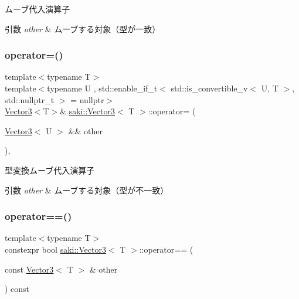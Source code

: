 ムーブ代入演算子 


\begin{DoxyParams}{引数}
{\em other} & ムーブする対象（型が一致） \\
\hline
\end{DoxyParams}
\mbox{\label{classsaki_1_1_vector3_ade6589bc06d9191aaccfe67cbd961a8b}} 
\subsubsection{\texorpdfstring{operator=()}{operator=()}\hspace{0.1cm}{\footnotesize\ttfamily [4/4]}}
{\footnotesize\ttfamily template$<$typename T$>$ \\
template$<$typename U , std\+::enable\+\_\+if\+\_\+t$<$ std\+::is\+\_\+convertible\+\_\+v$<$ U, T $>$, std\+::nullptr\+\_\+t $>$  = nullptr$>$ \\
\mbox{\hyperlink{classsaki_1_1_vector3}{Vector3}}$<$T$>$\& \mbox{\hyperlink{classsaki_1_1_vector3}{saki\+::\+Vector3}}$<$ T $>$\+::operator= (\begin{DoxyParamCaption}\item[{\mbox{\hyperlink{classsaki_1_1_vector3}{Vector3}}$<$ U $>$ \&\&}]{other }\end{DoxyParamCaption})\hspace{0.3cm}{\ttfamily [inline]}, {\ttfamily [noexcept]}}



型変換ムーブ代入演算子 


\begin{DoxyParams}{引数}
{\em other} & ムーブする対象（型が不一致） \\
\hline
\end{DoxyParams}
\mbox{\label{classsaki_1_1_vector3_ad03a150d0fa01d9a673081cb0ceb150e}} 
\subsubsection{\texorpdfstring{operator==()}{operator==()}}
{\footnotesize\ttfamily template$<$typename T$>$ \\
constexpr bool \mbox{\hyperlink{classsaki_1_1_vector3}{saki\+::\+Vector3}}$<$ T $>$\+::operator== (\begin{DoxyParamCaption}\item[{const \mbox{\hyperlink{classsaki_1_1_vector3}{Vector3}}$<$ T $>$ \&}]{other }\end{DoxyParamCaption}) const\hspace{0.3cm}{\ttfamily [inline]}}



